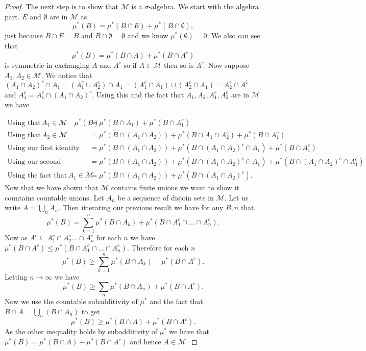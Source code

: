 \documentclass[11pt]{article}
\theoremstyle{definition}
\theoremstyle{remark}
\begin{document}
\begin{proof}
The next step is to show that $\mathscr{M}$ is a $\sigma$-algebra. We start with the algebra part. $E$ and $\emptyset$ are in $\mathscr{M}$ as
\[ \mu^*(B) = \mu^*(B \cap E) + \mu^*(B \cap \emptyset), \]
 just because $B \cap E = B$ and $B \cap \emptyset = \emptyset$ and we know $\mu^*(\emptyset) =0$. We also can see that
\[ \mu^*(B) = \mu^*(B \cap A) + \mu^*(B \cap A^c) \] is symmetric in exchanging $A$ and $A^c$ so if $A \in \mathscr{M}$ then so is $A^c$. Now suppose $A_1, A_2 \in \mathscr{M}$. We notice that $(A_1 \cap A_2)^c \cap A_1 = (A_1^c \cup A_2^c) \cap A_1 = (A_1^c \cap A_1) \cup (A_2^c \cap A_1) = A_2^c \cap A^1$ and $ A_1^c = A_1^c \cap(A_1 \cap A_2)^c$. Using this and the fact that $A_1, A_2, A_1^c, A_2^c$ are in $\mathscr{M}$ we have

\begin{align*}\mbox{Using that} \, A_1 \in \mathscr{M} \quad \mu^*(B) &= \mu^*(B \cap A_1) + \mu^*(B \cap A_1^c)\\
\mbox{Using that}\, A_2 \in \mathscr{M} \quad &= \mu^*(B \cap (A_1 \cap A_2)) + \mu^*(B \cap A_1 \cap A_2^c) + \mu^*(B \cap A_1^c)\\
\mbox{Using our first identity} \quad &= \mu^*(B \cap (A_1 \cap A_2)) + \mu^*(B \cap (A_1 \cap A_2)^c \cap A_1) + \mu^*(B \cap A_1^c)\\
\mbox{Using our second identiy} \quad &= \mu^*(B \cap (A_1 \cap A_2)) + \mu^*(B \cap (A_1 \cap A_2)^c \cap A_1) + \mu^*(B \cap (A_1 \cap A_2)^c \cap A_1^c)\\
\mbox{Using the fact that}\, A_1 \in \mathscr{M} \quad &= \mu^*(B \cap (A_1 \cap A_2)) + \mu^*(B \cap (A_1 \cap A_2)^c).
\end{align*}
Now that we have shown that $\mathscr{M}$ contains finite unions we want to show it countains countable unions. Let $A_n$ be a sequence of disjoin sets in $\mathscr{M}$. Let us write $A = \bigcup_n A_n$. Then itterating our previous result we have for any $B, n$ that
\[ \mu^*(B) = \sum_{k=1}^n \mu^*(B \cap A_k) + \mu^*( B \cap A_1^c \cap \dots \cap A_n^c). \] Now as $A^c \subseteq A_1^c \cap A_2^c \dots \cap A_n^c$ for each $n$ we have $\mu^*(B \cap A^c) \leq \mu^*(B \cap A_1^c \cap \dots \cap A_n^c)$. Therefore for each $n$
\[ \mu^*(B) \geq \sum_{k=1}^n \mu^*(B \cap A_k) + \mu^*(B \cap A^c). \] Letting $n \rightarrow \infty$ we have
\[ \mu^*(B) \geq \sum_n \mu^*(B \cap A_n) + \mu^*(B \cap A^c). \] Now we use the countable subadditivity of $\mu^*$ and the fact that $B \cap A = \bigcup_n (B \cap A_n)$ to get
\[ \mu^*(B) \geq \mu^*(B \cap A) + \mu^*(B \cap A^c). \] As the other inequality holds by subadditivity of $\mu^*$ we have that $\mu^*(B) = \mu^*(B \cap A) + \mu^*(B \cap A^c)$ and hence $A \in \mathscr{M}$.


\end{proof}
\end{document}
